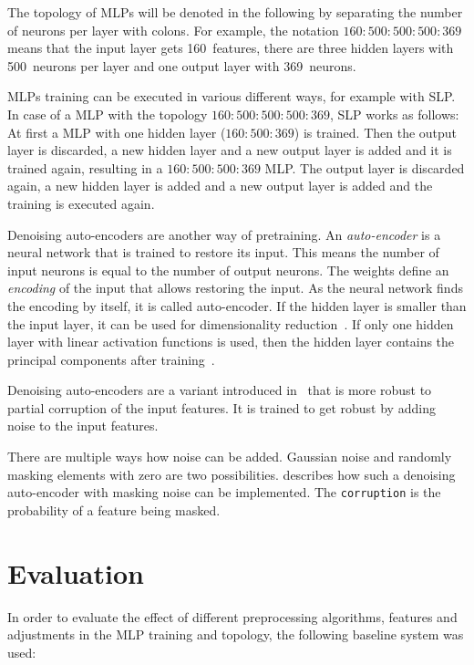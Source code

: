 \documentclass[9pt,technote]{IEEEtran}
\begin{document}
The topology of \glspl{MLP} will be denoted in the following by separating
the number of neurons per layer with colons. For example, the notation $160{:}500{:}500{:}500{:}369$
means that the input layer gets 160~features, there are three hidden layers
with 500~neurons per layer and one output layer with 369~neurons.

\glspl{MLP} training can be executed in
various different ways, for example with \gls{SLP}.
In case of a \gls{MLP} with the topology $160{:}500{:}500{:}500{:}369$,
\gls{SLP} works as follows: At first a \gls{MLP} with one hidden layer ($160{:}500{:}369$)
is trained. Then the output layer is discarded, a new hidden layer and a new
output layer is added and it is trained again, resulting in a $160{:}500{:}500{:}369$
\gls{MLP}. The output layer is discarded again, a new hidden layer is added and
a new output layer is added and the training is executed again.

Denoising auto-encoders are another way of pretraining. An
\textit{auto-encoder} is a neural network that is trained to restore its input.
This means the number of input neurons is equal to the number of output
neurons. The weights define an \textit{encoding} of the input that allows
restoring the input. As the neural network finds the encoding by itself, it is
called auto-encoder. If the hidden layer is smaller than the input layer, it
can be used for dimensionality reduction~\cite{Hinton1989}. If only one hidden
layer with linear activation functions is used, then the hidden layer contains
the principal components after training~\cite{Duda2001}.

Denoising auto-encoders are a variant introduced in~\cite{Vincent2008} that
is more robust to partial corruption of the input features. It is trained to
get robust by adding noise to the input features.

There are multiple ways how noise can be added. Gaussian noise and
randomly masking elements with zero are two possibilities. \cite{Deeplearning-Denoising-AE}
describes how such a denoising auto-encoder with masking noise can be
implemented. The \texttt{corruption} is the probability of a feature being
masked.

\section{Evaluation}\label{ch:Evaluation}
In order to evaluate the effect of different preprocessing algorithms, features
and adjustments in the \gls{MLP} training and topology, the following baseline
system was used:
\end{document}
